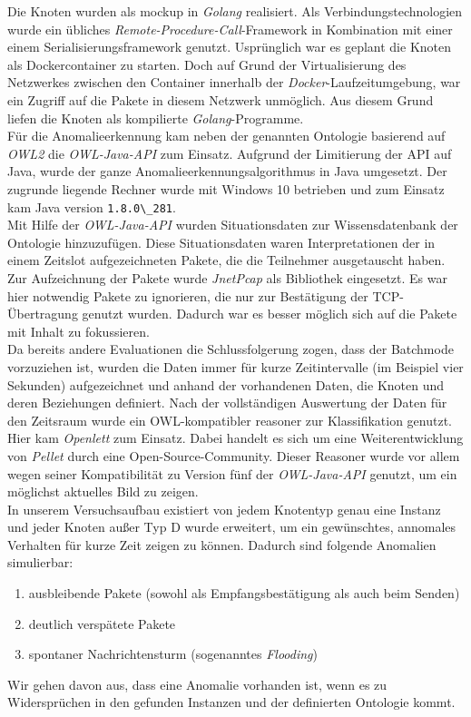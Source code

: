 Die Knoten wurden als \Gls{mockup} in \textit{Golang}\cite{golang} realisiert. Als Verbindungstechnologien wurde ein übliches \textit{Remote-Procedure-Call}-Framework\cite{grpc} in Kombination mit einer einem Serialisierungsframework\cite{protobuf} genutzt. Usprünglich war es geplant die Knoten als Dockercontainer\cite{docker} zu starten. Doch auf Grund der Virtualisierung des Netzwerkes zwischen den Container innerhalb der \textit{Docker}-Laufzeitumgebung, war ein Zugriff auf die Pakete in diesem Netzwerk unmöglich. Aus diesem Grund liefen die Knoten als kompilierte \textit{Golang}-Programme.\\
Für die Anomalieerkennung kam neben der genannten Ontologie basierend auf \textit{OWL2}\cite{owl2} die \textit{OWL-Java-API}\cite{owlapi} zum Einsatz. Aufgrund der Limitierung der API auf Java, wurde der ganze Anomalieerkennungsalgorithmus in Java umgesetzt. Der zugrunde liegende Rechner wurde mit Windows 10 betrieben und zum Einsatz kam Java version \verb|1.8.0\_281|.\\
Mit Hilfe der \textit{OWL-Java-API} wurden Situationsdaten zur Wissensdatenbank der Ontologie hinzuzufügen. Diese Situationsdaten waren Interpretationen der in einem Zeitslot aufgezeichneten Pakete, die die Teilnehmer ausgetauscht haben. Zur Aufzeichnung der Pakete wurde \textit{JnetPcap}\cite{jnetpcap} als Bibliothek eingesetzt. Es war hier notwendig Pakete zu ignorieren, die nur zur Bestätigung der TCP-Übertragung genutzt wurden. Dadurch war es besser möglich sich auf die Pakete mit Inhalt zu fokussieren.\\
Da bereits andere Evaluationen die Schlussfolgerung zogen, dass der Batchmode vorzuziehen ist, wurden die Daten immer für kurze Zeitintervalle (im Beispiel vier Sekunden) aufgezeichnet und anhand der vorhandenen Daten, die Knoten und deren Beziehungen definiert. Nach der vollständigen Auswertung der Daten für den Zeitsraum wurde ein OWL-kompatibler \Gls{reasoner} zur Klassifikation genutzt. Hier kam \textit{Openlett}\cite{openlett} zum Einsatz. Dabei handelt es sich um eine Weiterentwicklung von \textit{Pellet}\cite{pellet} durch eine Open-Source-Community. Dieser Reasoner wurde vor allem wegen seiner Kompatibilität zu Version fünf der \textit{OWL-Java-API} genutzt, um ein möglichst aktuelles Bild zu zeigen.\\
In unserem Versuchsaufbau existiert von jedem Knotentyp genau eine Instanz und jeder Knoten außer Typ D wurde erweitert, um ein gewünschtes, annomales Verhalten für kurze Zeit zeigen zu können. Dadurch sind folgende Anomalien simulierbar:
\begin{enumerate}
\item ausbleibende Pakete (sowohl als Empfangsbestätigung als auch beim Senden)
\item deutlich verspätete Pakete
\item spontaner Nachrichtensturm (sogenanntes \textit{Flooding})
\end{enumerate}
Wir gehen davon aus, dass eine Anomalie vorhanden ist, wenn es zu Widersprüchen in den gefunden Instanzen und der definierten Ontologie kommt.